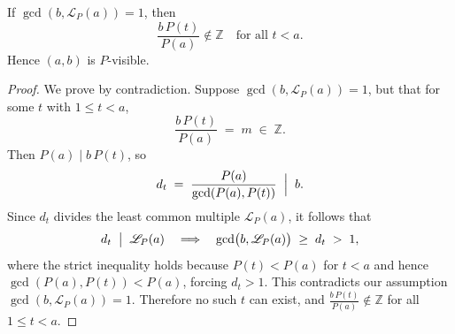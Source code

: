 \documentclass[10pt,a4paper]{amsart}
\begin{document}
\begin{theorem}
If \(\gcd(b,\mathscr{L}_P(a))=1\), then
\[
\frac{b\,P(t)}{P(a)}\notin\mathbb{Z}
\quad \text{for all } t<a.
\]
Hence \((a,b)\) is \(P\)-visible.
\end{theorem}

\begin{proof}
We prove by contradiction.  Suppose
\(\gcd(b,\mathscr{L}_P(a))=1\), but that for some \(t\) with \(1\le t<a\),
\[
\frac{b\,P(t)}{P(a)} \;=\; m \;\in\;\mathbb{Z}.
\]
Then \(P(a)\mid b\,P(t)\), so
\[
d_t \;=\;\frac{P(a)}{\gcd(P(a),P(t))}
\;\Bigm|\;b.
\]
Since \(d_t\) divides the least common multiple \(\mathscr{L}_P(a)\), it follows that
\[
d_t \;\bigm|\;\mathscr{L}_P(a)
\quad\Longrightarrow\quad
\gcd\bigl(b,\mathscr{L}_P(a)\bigr)\;\ge\;d_t\;>\;1,
\]
where the strict inequality holds because \(P(t)<P(a)\) for \(t<a\)
and hence \(\gcd(P(a),P(t))<P(a)\), forcing \(d_t>1\).  This contradicts
our assumption \(\gcd(b,\mathscr{L}_P(a))=1\).  Therefore no such \(t\) can exist,
and
\(\tfrac{b\,P(t)}{P(a)}\notin\mathbb{Z}\) for all \(1\le t<a\).


\end{proof}
\end{document}
